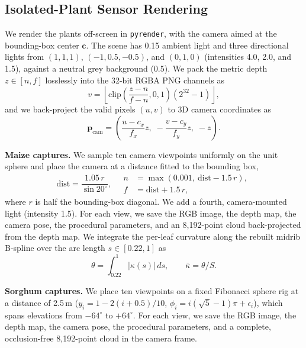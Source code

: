 \documentclass[10pt,twocolumn,letterpaper]{article}
\begin{document}


\subsection{Isolated-Plant Sensor Rendering}
\label{sec:isolated-rendering}
We render the plants off-screen in \texttt{pyrender}, with the camera aimed at the bounding-box center $\mathbf{c}$. The scene has 0.15 ambient light and three directional lights from $(1,1,1)$, $(-1,0.5,-0.5)$, and $(0,1,0)$ (intensities 4.0, 2.0, and 1.5), against a neutral grey background (0.5). We pack the metric depth $z \in [n, f]$ losslessly into the 32-bit RGBA PNG channels as
\begin{equation}
  v = \left\lfloor \mathrm{clip}\left(\frac{z-n}{f-n}, 0, 1\right) (2^{32}-1) \right\rfloor,
\end{equation}
and we back-project the valid pixels $(u,v)$ to 3D camera coordinates as
\begin{equation}
  \mathbf{p}_{\mathrm{cam}} = \left( \frac{u - c_x}{f_x} z,\; -\frac{v - c_y}{f_y} z,\; -z \right).
  \label{eq:supp-backproject}
\end{equation}

\noindent\textbf{Maize captures.} We sample ten camera viewpoints uniformly on the unit sphere and place the camera at a distance fitted to the bounding box,
\begin{equation}
  \mathrm{dist} = \frac{1.05\,r}{\sin 20^\circ},\quad
  \begin{aligned}
    n &= \max(0.001,\ \mathrm{dist} - 1.5\,r),\\
    f &= \mathrm{dist} + 1.5\,r,
  \end{aligned}
  \label{eq:supp-maizecam}
\end{equation}
where $r$ is half the bounding-box diagonal. We add a fourth, camera-mounted light (intensity 1.5). For each view, we save the RGB image, the depth map, the camera pose, the procedural parameters, and an 8{,}192-point cloud back-projected from the depth map. We integrate the per-leaf curvature along the rebuilt midrib B-spline over the arc length $s \in [0.22, 1]$ as
\begin{equation}
  \theta = \int_{0.22}^{1} \lvert \kappa(s) \rvert \, ds,
  \qquad \bar\kappa = \theta / S.
  \label{eq:supp-curvature}
\end{equation}

\noindent\textbf{Sorghum captures.} We place ten viewpoints on a fixed Fibonacci sphere rig at a distance of 2.5\,m ($y_i = 1 - 2(i+0.5)/10$, $\phi_i = i(\sqrt{5}-1)\pi + \epsilon_i$), which spans elevations from $-64^\circ$ to $+64^\circ$. For each view, we save the RGB image, the depth map, the camera pose, the procedural parameters, and a complete, occlusion-free 8{,}192-point cloud in the camera frame.
\end{document}

